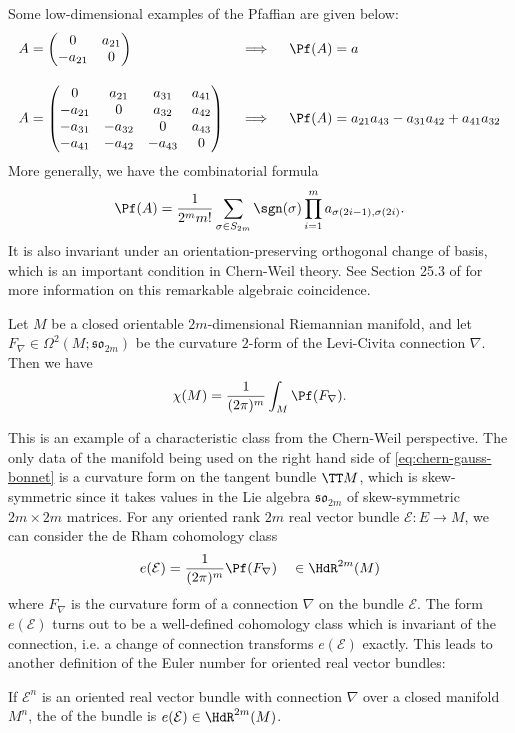 \begin{example}
  Some low-dimensional examples of the Pfaffian are given below:
  \[
    \begin{aligned}
      &A=\begin{pmatrix}
        0 & a_{21}\\
        -a_{21}&0
    \end{pmatrix}&
      &\implies\quad \Pf(A) = a
    \\[1em]
      &A=\begin{pmatrix}
        0 & a_{21} & a_{31} & a_{41}\\
        -a_{21} & 0 & a_{32} & a_{42}\\
        -a_{31} & -a_{32} & 0 & a_{43}\\
        -a_{41} & -a_{42} & -a_{43} & 0\\
    \end{pmatrix}& &\implies\quad \Pf(A) = a_{21}a_{43}-a_{31}a_{42}+a_{41}a_{32}
    \end{aligned}
  \]
  More generally, we have the combinatorial formula
  \[
    \Pf(A) = \frac{1}{2^m m!}\sum_{\sigma \in S_{2m}}\sgn(\sigma)\prod^m_{i=1}a_{\sigma(2i-1),\sigma(2i)}.
  \]
  It is also invariant under an orientation-preserving orthogonal change of basis, which is an important condition in Chern-Weil theory.
  See Section 25.3 of \cite{tu2017geometry} for more information on this remarkable algebraic coincidence. 
\end{example}


\begin{theorem}
  Let $M$ be a closed orientable $2m$-dimensional Riemannian manifold, and let $F_\nabla \in \Omega^2(M; \mathfrak{so}_{2m})$ be the curvature $2$-form of the Levi-Civita connection $\nabla$. Then we have
  \begin{equation}\label{eq:chern-gauss-bonnet}
    \chi(M) = \frac{1}{(2\pi)^m}\int_M \Pf(F_\nabla).
  \end{equation}
\end{theorem}

This is an example of a characteristic class from the Chern-Weil perspective. The only data of the manifold being used on the right hand side of \cref{eq:chern-gauss-bonnet} is a curvature form on the tangent bundle $\TT M$, which is skew-symmetric since it takes values in the Lie algebra $\mathfrak{so}_{2m}$ of skew-symmetric $2m\times 2m$ matrices. 
For any oriented rank $2m$ real vector bundle $\mathcal{E} : E \to M$, we can consider the de Rham cohomology class
\[
  e(\mathcal{E}) = \frac{1}{(2\pi)^m}\Pf(F_\nabla) \quad \in \HdR^{2m}(M)
\]
where $F_\nabla$ is the curvature form of a connection $\nabla$ on the bundle $\mathcal{E}$. The form $e(\mathcal{E})$ turns out to be a well-defined cohomology class which is invariant of the connection, i.e. a change of connection transforms $e(\mathcal{E})$ exactly. This leads to another definition of the Euler number for oriented real vector bundles:
\begin{definition}
  If $\mathcal{E}^n$ is an oriented real vector bundle with connection $\nabla$ over a closed manifold $M^n$, the  of the bundle is $e(\mathcal{E})\in \HdR^{2m}(M)$.
\end{definition}

